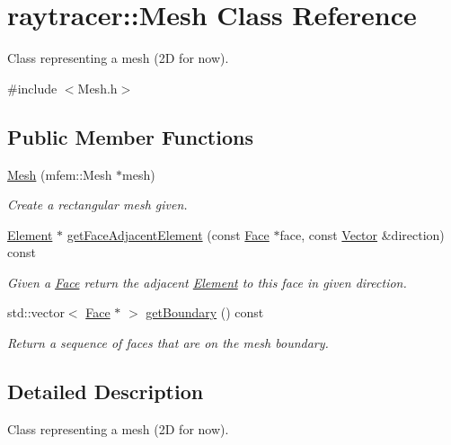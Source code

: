 \hypertarget{classraytracer_1_1Mesh}{}\section{raytracer\+:\+:Mesh Class Reference}
\label{classraytracer_1_1Mesh}


Class representing a mesh (2D for now).  




{\ttfamily \#include $<$Mesh.\+h$>$}

\subsection*{Public Member Functions}
\begin{DoxyCompactItemize}
\item 
\mbox{\label{classraytracer_1_1Mesh_ad009fe99caff6e954dd237c3d62a3dc1}} 
\hyperlink{classraytracer_1_1Mesh_ad009fe99caff6e954dd237c3d62a3dc1}{Mesh} (mfem\+::\+Mesh $\ast$mesh)
\begin{DoxyCompactList}\small\item\em Create a rectangular mesh given. \end{DoxyCompactList}\item 
\hyperlink{classraytracer_1_1Element}{Element} $\ast$ \hyperlink{classraytracer_1_1Mesh_a37bb91c21c404e4ff4432d7169918c38}{get\+Face\+Adjacent\+Element} (const \hyperlink{classraytracer_1_1Face}{Face} $\ast$face, const \hyperlink{classraytracer_1_1Vector}{Vector} \&direction) const
\begin{DoxyCompactList}\small\item\em Given a \hyperlink{classraytracer_1_1Face}{Face} return the adjacent \hyperlink{classraytracer_1_1Element}{Element} to this face in given direction. \end{DoxyCompactList}\item 
std\+::vector$<$ \hyperlink{classraytracer_1_1Face}{Face} $\ast$ $>$ \hyperlink{classraytracer_1_1Mesh_a4f2718e871ca63809445b33b56fa02de}{get\+Boundary} () const
\begin{DoxyCompactList}\small\item\em Return a sequence of faces that are on the mesh boundary. \end{DoxyCompactList}\end{DoxyCompactItemize}


\subsection{Detailed Description}
Class representing a mesh (2D for now). 


